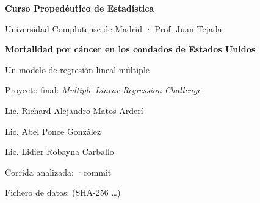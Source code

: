\begin{titlepage}
\hypersetup{pageanchor=false}
\sffamily\raggedright\setlength{\parindent}{0pt}
\vspace*{1.5cm}
{\color{acento}\large\bfseries Curso Propedéutico de Estadística\par}
{\color{tinta2}\normalsize Universidad Complutense de Madrid · Prof. Juan Tejada\par}
\vspace{2.2cm}
{\Huge\bfseries Mortalidad por cáncer en los condados de Estados Unidos\par}
\vspace{0.6cm}
{\LARGE Un modelo de regresión lineal múltiple\par}
\vspace{1.4cm}
{\color{tinta2}\large Proyecto final: \emph{Multiple Linear Regression Challenge}\par}
\vfill
{\large Lic. Richard Alejandro Matos Arderí\par
Lic. Abel Ponce González\par
Lic. Lidier Robayna Carballo\par}
\vspace{1.2cm}
{\small\color{tinta2}
Corrida analizada: \quad·\quad commit \par
Fichero de datos:  (SHA-256 \dots)\par}
\end{titlepage}
\hypersetup{pageanchor=true}
